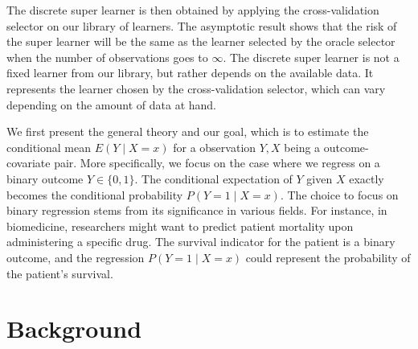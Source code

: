 \documentclass[11pt, a4paper]{article}
\theoremstyle{definition}
\theoremstyle{remark}
\begin{document}
The discrete super learner is then obtained by applying the cross-validation selector on our library of learners. The asymptotic result shows that the risk of the super learner will be the same as the learner selected by the oracle selector when the number of observations goes to $ \infty $. The discrete super learner is not a fixed learner from our library, but rather depends on the available data. It represents the learner chosen by the cross-validation selector, which can vary depending on the amount of data at hand.

We first present the general theory and our goal, which is to estimate the conditional mean $ E(Y \mid X = x) $ for a observation $ Y, X $ being a outcome-covariate pair. More specifically, we focus on the case where we regress on a binary outcome $ Y \in \{0,1\} $. The conditional expectation of $ Y $ given $ X $ exactly becomes the conditional probability $ P(Y = 1 \mid X = x) $. The choice to focus on binary regression stems from its significance in various fields. For instance, in biomedicine, researchers might want to predict patient mortality upon administering a specific drug. The survival indicator for the patient is a binary outcome, and the regression $ P(Y = 1 \mid X = x) $ could represent the probability of the patient's survival. 

\section{Background}
\end{document}

